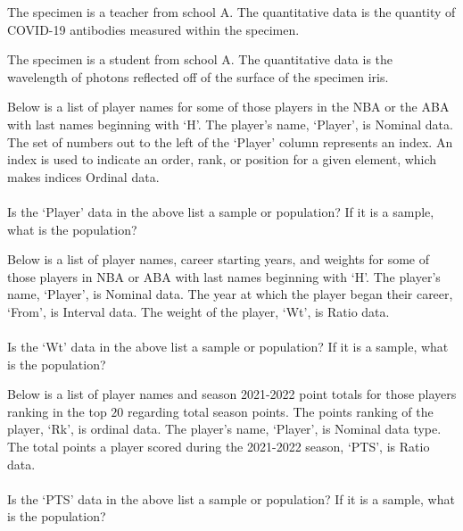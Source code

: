 \begin{example}
The specimen is a teacher from school A. The quantitative data is the quantity of COVID-19 antibodies measured within the specimen. 
\end{example}

\begin{example}
The specimen is a student from school A. The quantitative data is the wavelength of photons reflected off of the surface of the specimen iris. 
\end{example}

\begin{dataset}
Below is a list of player names for some of those players in the NBA or the ABA with last names beginning with `H'. The player's name, `Player', is Nominal data. The set of numbers out to the left of the `Player' column represents an index. An index is used to indicate an order, rank, or position for a given element, which makes indices Ordinal data. \\[1ex]
\\[2ex]
Is the `Player' data in the above list a sample or population? If it is a sample, what is the population?
\end{dataset}

\begin{dataset}
Below is a list of player names, career starting years, and weights for some of those players in NBA or ABA with last names beginning with `H'. The player's name, `Player', is Nominal data. The year at which the player began their career, `From', is Interval data. The weight of the player, `Wt', is Ratio data.\\[1ex]
\\[2ex]
Is the `Wt' data in the above list a sample or population? If it is a sample, what is the population?
\end{dataset}

\begin{dataset}
Below is a list of player names and season 2021-2022 point totals for those players ranking in the top $20$ regarding total season points. The points ranking of the player, `Rk', is ordinal data. The player's name, `Player', is Nominal data type. The total points a player scored during the 2021-2022 season, `PTS', is Ratio data.\\[1ex]
\\[2ex]
Is the `PTS' data in the above list a sample or population? If it is a sample, what is the population?
\end{dataset}